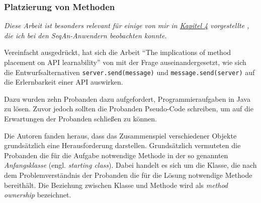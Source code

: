 \subsubsection{Platzierung von Methoden}
\label{sec:method-placement}

\begin{important}
\textit{Diese Arbeit ist besonders relevant für einige von mir in \href{sec:Ergebnisse}{Kapitel 4} vorgestellte , die ich bei den SeqAn-Anwendern beobachten konnte.}  

Vereinfacht ausgedrückt, hat sich die Arbeit ``The implications of method placement on API learnability'' von \cite{Stylos:2008jt} mit der Frage auseinandergesetzt, wie sich die Entwurfsalternativen \texttt{server.send(message)} und \texttt{message.send(server)} auf die Erlernbarkeit einer API auswirken.

Dazu wurden zehn Probanden dazu aufgefordert, Programmieraufgaben in Java zu lösen. Zuvor jedoch sollten die Probanden Pseudo-Code schreiben, um auf die Erwartungen der Probanden schließen zu können.

Die Autoren fanden heraus, dass das Zusammenspiel verschiedener Objekte grundsätzlich eine Herausforderung darstellen. Grundsätzlich vermuteten die Probanden die für die Aufgabe notwendige Methode in der so genannten \textit{Anfangsklasse} (engl. \textit{starting class}). Dabei handelt es sich um die Klasse, die nach dem Problemverständnis der Probanden die für die Lösung notwendige Methode bereithält. Die Beziehung zwischen Klasse und Methode wird als \textit{method ownership} bezeichnet.


\end{important}
